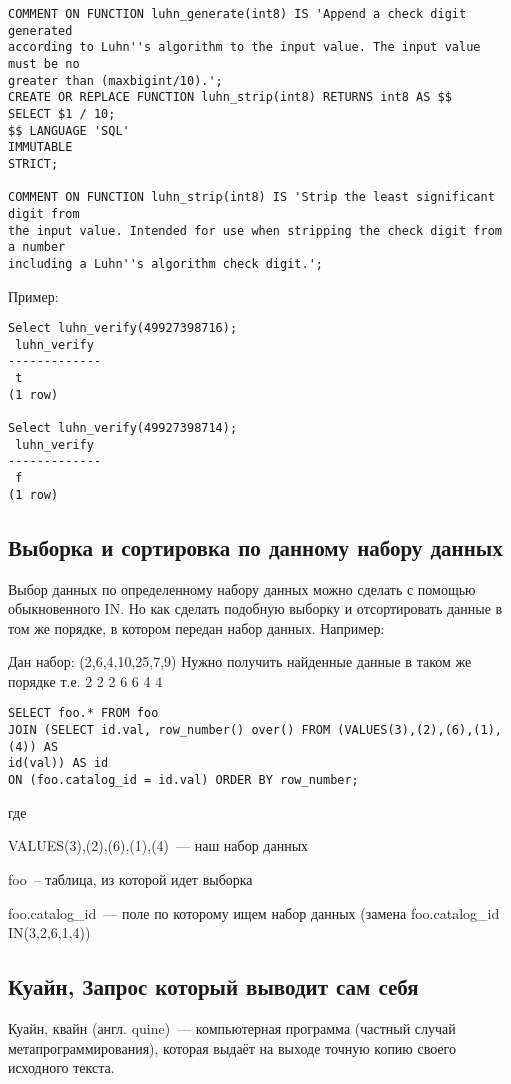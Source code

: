 \begin{lstlisting}[label=lst:snippets10,title=snippets/luhn\_algorithm.sql]
COMMENT ON FUNCTION luhn_generate(int8) IS 'Append a check digit generated
according to Luhn''s algorithm to the input value. The input value must be no
greater than (maxbigint/10).';
CREATE OR REPLACE FUNCTION luhn_strip(int8) RETURNS int8 AS $$
SELECT $1 / 10;
$$ LANGUAGE 'SQL'
IMMUTABLE
STRICT;
 
COMMENT ON FUNCTION luhn_strip(int8) IS 'Strip the least significant digit from
the input value. Intended for use when stripping the check digit from a number
including a Luhn''s algorithm check digit.';
\end{lstlisting}

Пример:
\begin{lstlisting}[label=lst:snippets11,caption=Алгоритм Луна. Пример]
Select luhn_verify(49927398716);
 luhn_verify 
-------------
 t
(1 row)

Select luhn_verify(49927398714);
 luhn_verify 
-------------
 f
(1 row)

\end{lstlisting}

\subsection{Выборка и сортировка по данному набору данных}
Выбор данных по определенному набору данных можно сделать с помощью обыкновенного IN. Но как сделать подобную выборку и отсортировать 
данные в том же порядке, в котором передан набор данных. Например:

Дан набор: (2,6,4,10,25,7,9)
Нужно получить найденные данные в таком же порядке т.е. 2 2 2 6 6 4 4

\begin{lstlisting}[label=lst:snippets12,title=snippets/order\_like\_in.sql]
SELECT foo.* FROM foo                                           
JOIN (SELECT id.val, row_number() over() FROM (VALUES(3),(2),(6),(1),(4)) AS
id(val)) AS id
ON (foo.catalog_id = id.val) ORDER BY row_number;
\end{lstlisting}

где

VALUES(3),(2),(6),(1),(4)~--- наш набор данных

foo~-- таблица, из которой идет выборка

foo.catalog\_id~--- поле по которому ищем набор данных (замена foo.catalog\_id IN(3,2,6,1,4))

\subsection{Куайн, Запрос который выводит сам себя}
Куайн, квайн (англ. quine)~--- компьютерная программа (частный случай метапрограммирования), 
которая выдаёт на выходе точную копию своего исходного текста. 

